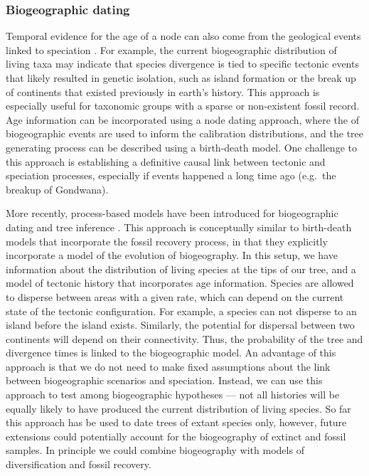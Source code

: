 \documentclass[11pt]{article}
\begin{document}

\subsubsection{Biogeographic dating}

Temporal evidence for the age of a node can also come from the geological events linked to speciation \cite{Ho2015,deBaets2016}.
For example, the current biogeographic distribution of living taxa may indicate that species divergence is tied to specific tectonic events that likely resulted in genetic isolation, such as island formation or the break up of continents that existed previously in earth's history.
This approach is especially useful for taxonomic groups with a sparse or non-existent fossil record.
Age information can be incorporated using a node dating approach, where the of biogeographic events are used to inform the calibration distributions, and the tree generating process can be described using a birth-death model.
One challenge to this approach is establishing a definitive causal link between tectonic and speciation processes, especially if events happened a long time ago (e.g.\ the breakup of Gondwana).


More recently, process-based models have been introduced for biogeographic dating and tree inference \cite{Landis2016,Landis2019}.
This approach is conceptually similar to birth-death models that incorporate the fossil recovery process, in that they explicitly incorporate a model of the evolution of biogeography.
In this setup, we have information about the distribution of living species at the tips of our tree, and a model of tectonic history that incorporates age information. 
Species are allowed to disperse between areas with a given rate, which can depend on the current state of the tectonic configuration.
For example, a species can not disperse to an island before the island exists. 
Similarly, the potential for dispersal between two continents will depend on their connectivity.
Thus, the probability of the tree and divergence times is linked to the biogeographic model.
An advantage of this approach is that we do not need to make fixed assumptions about the link between biogeographic scenarios and speciation.
Instead, we can use this approach to test among biogeographic hypotheses --- not all histories will be equally likely to have produced the current distribution of living species.
So far this approach has be used to date trees of extant species only, however, future extensions could potentially account for the biogeography of extinct and fossil samples.
In principle we could combine biogeography with models of diversification and fossil recovery. 
\end{document}
